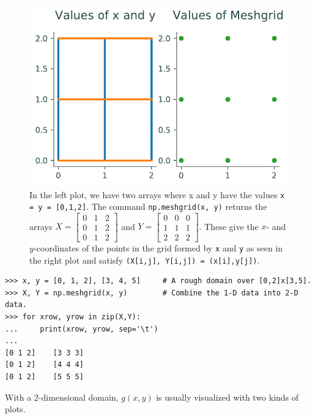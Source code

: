 \begin{figure}[H]
\includegraphics[width=\linewidth]{figures/meshplot_fig.pdf}
\caption[Meshplot example]{In the left plot, we have two arrays where x and y have the values \texttt{x = y = [0,1,2]}. The command \texttt{np.meshgrid(x, y)} returns the arrays 
$X= \begin{bmatrix} 0 & 1 & 2 \\
 0 & 1 & 2 \\
 0 & 1 & 2 \end{bmatrix}$ and $Y= \begin{bmatrix} 0 & 0 & 0 \\
 1 & 1 & 1 \\
 2 & 2 & 2\end{bmatrix}.$
 These give the $x$- and $y$-coordinates of the points in the grid formed by \texttt{x} and \texttt{y} as seen in the right plot and satisfy \texttt{(X[i,j], Y[i,j]) = (x[i],y[j])}.}
\label{fig:meshgrid}
\end{figure}

\begin{lstlisting}
>>> x, y = [0, 1, 2], [3, 4, 5]     # A rough domain over [0,2]x[3,5].
>>> X, Y = np.meshgrid(x, y)        # Combine the 1-D data into 2-D data.
>>> for xrow, yrow in zip(X,Y):
...     print(xrow, yrow, sep='\t')
...
[0 1 2]    [3 3 3]
[0 1 2]    [4 4 4]
[0 1 2]    [5 5 5]
\end{lstlisting}

With a 2-dimensional domain, $g(x,y)$ is usually visualized with two kinds of plots.

